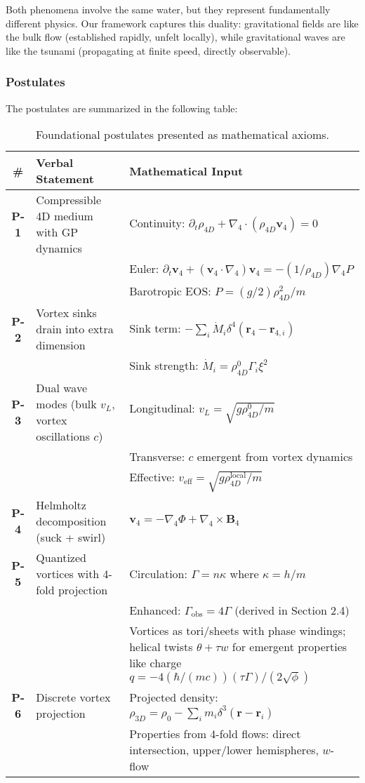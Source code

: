 Both phenomena involve the same water, but they represent fundamentally different physics. Our framework captures this duality: gravitational fields are like the bulk flow (established rapidly, unfelt locally), while gravitational waves are like the tsunami (propagating at finite speed, directly observable).

\subsubsection{Postulates}

The postulates are summarized in the following table:

\begin{table}[H]
\centering
\begin{tabularx}{\textwidth}{|c|Y|Y|}
\hline
\# & Verbal Statement & Mathematical Input \\
\hline
\textbf{P-1} & Compressible 4D medium with GP dynamics & Continuity: $\partial_t \rho_{4D} + \nabla_4 \cdot (\rho_{4D} \mathbf{v}_4) = 0$ \\
& & Euler: $\partial_t \mathbf{v}_4 + (\mathbf{v}_4 \cdot \nabla_4) \mathbf{v}_4 = -(1/\rho_{4D}) \nabla_4 P$ \\
& & Barotropic EOS: $P = (g/2) \rho_{4D}^2 / m$ \\
\hline
\textbf{P-2} & Vortex sinks drain into extra dimension & Sink term: $-\sum_i \dot{M}_i \delta^4(\mathbf{r}_4 - \mathbf{r}_{4,i})$ \\
& & Sink strength: $\dot{M}_i = \rho_{4D}^0 \Gamma_i \xi^2$ \\
\hline
\textbf{P-3} & Dual wave modes (bulk $v_L$, vortex oscillations $c$) & Longitudinal: $v_L = \sqrt{g \rho_{4D}^0 / m}$ \\
& & Transverse: $c$ emergent from vortex dynamics \\
& & Effective: $v_{\text{eff}} = \sqrt{g \rho_{4D}^{\text{local}} / m}$ \\
\hline
\textbf{P-4} & Helmholtz decomposition (suck + swirl) & $\mathbf{v}_4 = -\nabla_4 \Phi + \nabla_4 \times \mathbf{B}_4$ \\
\hline
\textbf{P-5} & Quantized vortices with 4-fold projection & Circulation: $\Gamma = n \kappa$ where $\kappa = h / m$ \\
& & Enhanced: $\Gamma_{\text{obs}} = 4 \Gamma$ (derived in Section 2.4) \\
& & Vortices as tori/sheets with phase windings; helical twists $\theta + \tau w$ for emergent properties like charge $q = -4 (\hbar / (m c)) (\tau \Gamma) / (2 \sqrt{\phi})$ \\
\hline
\textbf{P-6} & Discrete vortex projection & Projected density: $\rho_{3D} = \rho_0 - \sum_i m_i \delta^3(\mathbf{r} - \mathbf{r}_i)$ \\
& & Properties from 4-fold flows: direct intersection, upper/lower hemispheres, $w$-flow \\
\hline
\end{tabularx}
\caption{Foundational postulates presented as mathematical axioms.}
\label{tab:postulates}
\end{table}

